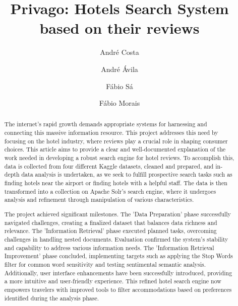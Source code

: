 \documentclass[sigconf]{acmart}
\begin{document}
\title{Privago: Hotels Search System based on their reviews}

\author{André Costa}

\author{André Ávila}

\author{Fábio Sá}

\author{Fábio Morais}


\begin{abstract}
The internet's rapid growth demands appropriate systems for harnessing and connecting this massive information resource. This project addresses this need by focusing on the hotel industry, where reviews play a crucial role in shaping consumer choices. This article aims to provide a clear and well-documented explanation of the work needed in developing a robust search engine for hotel reviews. To accomplish this, data is collected from four different Kaggle datasets, cleaned and prepared, and in-depth data analysis is undertaken, as we seek to fulfill prospective search tasks such as finding hotels near the airport or finding hotels with a helpful staff. The data is then transformed into a collection on Apache Solr's search engine, where it undergoes analysis and refinement through manipulation of various characteristics.

The project achieved significant milestones. The 'Data Preparation' phase successfully navigated challenges, creating a finalized dataset that balances data richness and relevance. The 'Information Retrieval' phase executed planned tasks, overcoming challenges in handling nested documents. Evaluation confirmed the system's stability and capability to address various information needs. The 'Information Retrieval Improvement' phase concluded, implementing targets such as applying the Stop Words filter for common word sensitivity and testing sentimental semantic analysis. Additionally, user interface enhancements have been successfully introduced, providing a more intuitive and user-friendly experience. This refined hotel search engine now empowers travelers with improved tools to filter accommodations based on preferences identified during the analysis phase.
\end{abstract}
\end{document}
